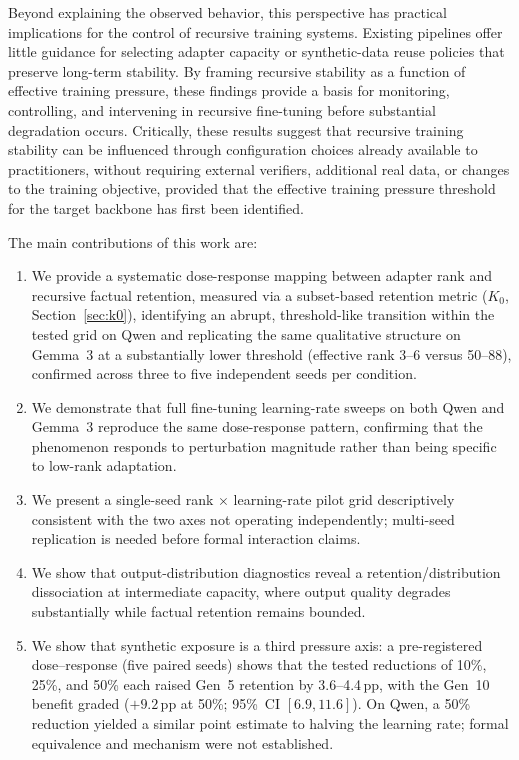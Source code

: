 \documentclass[a4paper,fleqn]{cas-dc}
\newif\ifshowchanges
\newcommand{\rev}[1]{\ifshowchanges{\color{blue}#1}\else{#1}\fi}
\begin{document}
Beyond explaining the observed behavior, this perspective has practical
implications for the control of recursive training systems. Existing
pipelines offer little guidance for selecting adapter capacity or synthetic-data
reuse policies that preserve long-term stability. By framing recursive stability
as a function of effective training pressure, these findings provide a
basis for monitoring, controlling, and intervening in recursive fine-tuning
before substantial degradation occurs. Critically, these results suggest that
recursive training stability can be influenced through configuration choices
already available to practitioners, without requiring external verifiers,
additional real data, or changes to the training objective, provided that the
effective training pressure threshold for the target backbone has first been
identified.

The main contributions of this work are:
\begin{enumerate}
    \item We provide a systematic dose-response mapping between adapter rank and
    recursive factual retention, measured via a subset-based retention metric
    ($K_0$, Section~\ref{sec:k0}), identifying 
\rev{an abrupt, threshold-like transition within the tested grid} on Qwen
    and replicating the same qualitative structure on Gemma~3 at a
    substantially lower threshold (effective rank 3--6 versus 50--88),
    confirmed across three to five independent seeds per condition.
    \item We demonstrate that full fine-tuning learning-rate sweeps on both
    Qwen and Gemma~3 reproduce the same dose-response pattern, confirming that
    the phenomenon responds to perturbation magnitude rather than being
    specific to low-rank adaptation.
    \item \rev{We present a single-seed rank $\times$ learning-rate pilot grid descriptively consistent with the two axes not operating independently; multi-seed replication is needed before formal interaction claims.}
    \item We show that output-distribution diagnostics reveal a
    retention/distribution dissociation at intermediate capacity, where output
    quality degrades substantially while factual retention remains bounded.
    \item We show that synthetic exposure is a third pressure axis: a
    pre-registered dose--response (five paired seeds) shows that \rev{the tested
    reductions of 10\%, 25\%, and 50\%} each raised Gen~5 retention by \rev{3.6--4.4\,pp},
    with the Gen~10 benefit graded (\rev{$+9.2$}\,pp at 50\%; 95\%~CI $[6.9, 11.6]$).
    \rev{On Qwen, a 50\% reduction yielded a similar point estimate to halving the learning rate; formal equivalence and mechanism were not established.}
\end{enumerate}
\end{document}
